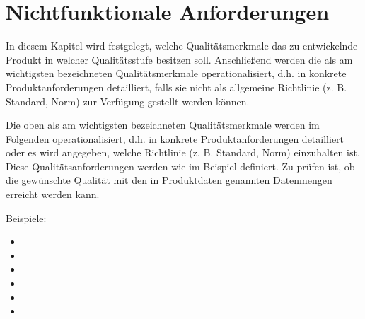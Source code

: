 

\chapter{Nichtfunktionale Anforderungen}
\label{chap:non_functional_req}

In diesem Kapitel wird festgelegt, welche Qualitätsmerkmale das zu entwickelnde
Produkt in welcher Qualitätsstufe besitzen soll. Anschließend werden die als am
wichtigsten bezeichneten Qualitätsmerkmale operationalisiert, d.h. in konkrete
Produktanforderungen detailliert, falls sie nicht als allgemeine Richtlinie (z.
B. Standard, Norm) zur Verfügung gestellt werden können.


Die oben als am wichtigsten bezeichneten Qualitätsmerkmale werden im Folgenden
operationalisiert, d.h. in konkrete Produktanforderungen detailliert oder es
wird angegeben, welche Richtlinie (z. B. Standard, Norm) einzuhalten ist. Diese
Qualitätsanforderungen werden wie im Beispiel definiert. Zu prüfen ist, ob die
gewünschte Qualität mit den in Produktdaten genannten Datenmengen erreicht
werden kann.


Beispiele:

\begin{itemize}

\item  {}
\item  {}
\item  {}
\item  {}
\item  {}
\item  {}

\end{itemize}
